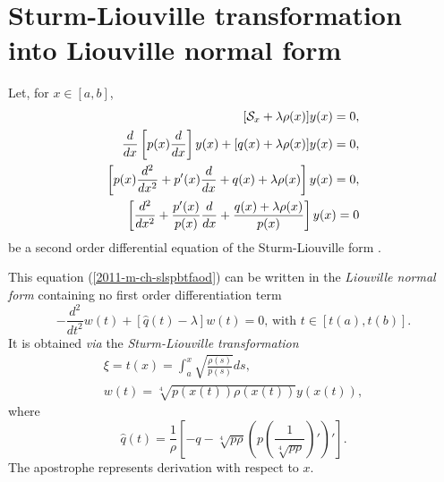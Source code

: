 \section{Sturm-Liouville transformation into Liouville normal form}
 Let, for $x\in [a,b]$,
\begin{equation}
\begin{split}
[{\cal S}_x  +\lambda \rho (x)] y(x)=0,\\
\frac{d}{dx}\left[ p(x) \frac{d}{dx}\right] y(x) + [q(x) +\lambda \rho (x)]y(x)=0,\\
\left[p(x)\frac{d^2 }{dx^2} + p'(x) \frac{d}{dx} + q(x) +\lambda \rho (x)\right] y(x)=0,\\
\left[\frac{d^2 }{dx^2} + \frac{p'(x)}{p(x)} \frac{d}{dx} + \frac{q(x) +\lambda \rho (x)}{p(x)}\right] y(x)=0
\end{split}
\label{2011-m-ch-slspbtfaod}
\end{equation}
be a second order differential equation of the
Sturm-Liouville form
 \cite{birkhoff-Rota-48}.

This equation (\ref{2011-m-ch-slspbtfaod}) can be written in the
{\em Liouville normal form}
 containing no first order differentiation term
\begin{equation}
-\frac{d^2}{dt^2} w(t) + [\hat{q}(t) -\lambda ] w(t)=0  \textrm{, with }t\in [ t(a)  , t(b)] .
\label{2011-m-ch-slspbtfaolnf}
\end{equation}
It is obtained {\em via} the
{\em Sturm-Liouville transformation}
\begin{equation}
\begin{split}
\xi= t(x) =   \int_a^x \sqrt{\frac{\rho(s)}{p(s)}}  ds,   \\
w(t)= \sqrt[4]{p(x(t))\rho(x(t))} y (x(t)),
\end{split}
\end{equation}
where
\begin{equation}
\hat{q}(t)= \frac{1}{\rho }\left[-q -\sqrt[4]{p\rho }
\left(p\left( \frac{1}{\sqrt[4]{p\rho }}\right)'\right)'\right].
\end{equation}
The apostrophe represents derivation with respect to $x$.

